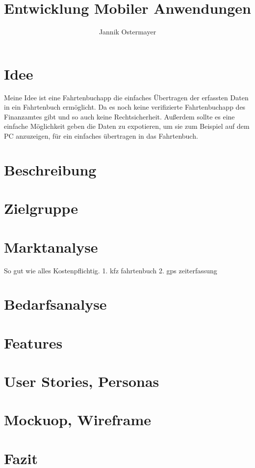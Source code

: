 \documentclass{article}
\title{Entwicklung Mobiler Anwendungen}
\author{Jannik Ostermayer}
\begin{document}
\maketitle

\section{Idee}
Meine Idee ist eine Fahrtenbuchapp die einfaches Übertragen der erfassten Daten in ein Fahrtenbuch ermöglicht.
Da es noch keine verifizierte Fahrtenbuchapp des Finanzamtes gibt und so auch keine Rechtsicherheit.
Außerdem sollte es eine einfache Möglichkeit geben die Daten zu expotieren, um sie zum Beispiel auf dem
PC anzuzeigen, für ein einfaches übertragen in das Fahrtenbuch.

\section{Beschreibung}

\section{Zielgruppe}

\section{Marktanalyse}
So gut wie alles Kostenpflichtig.
1. kfz fahrtenbuch
2. gps zeiterfassung

\section{Bedarfsanalyse}

\section{Features}

\section{User Stories, Personas}

\section{Mockuop, Wireframe}

\section{Fazit}
\end{document}
